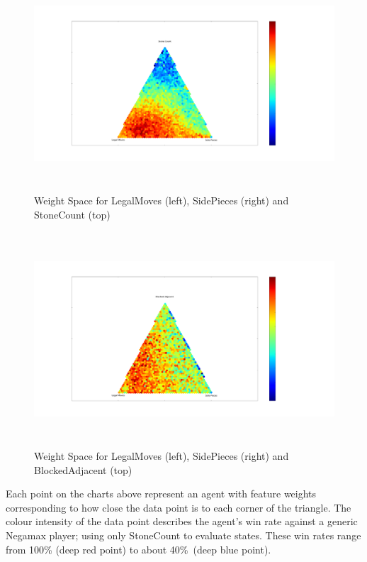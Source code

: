 \documentclass[11pt]{article}
\begin{document}
\begin{figure}[H]
  \centering
   \includegraphics[trim= 12cm 4.45cm 23cm 8cm, clip, height=8cm]{../Graphs/LegalMoves_Count_SidePieces_Triangle.pdf} 
  \caption{Weight Space for LegalMoves (left), SidePieces (right) and StoneCount (top)}
  \label{fig:triangle1}
\end{figure}

\begin{figure}[H]
  \centering
  \includegraphics[trim= 12cm 4.45cm 23cm 8cm, clip, height=8cm]{../Graphs/LegalMoves_BlockedAdjacent_SidePieces_Triangle.pdf} 
  \caption{Weight Space for LegalMoves (left), SidePieces (right) and BlockedAdjacent (top)}
  \label{fig:triangle2}
\end{figure}

Each point on the charts above represent an agent with feature weights corresponding to
how close the data point is to each corner of the triangle. The colour intensity of the data
point describes the agent's win rate against a generic Negamax player; using only StoneCount
to evaluate states. These win rates range from 100\% (deep red point) to about 40\%\ (deep blue point).
\end{document}

